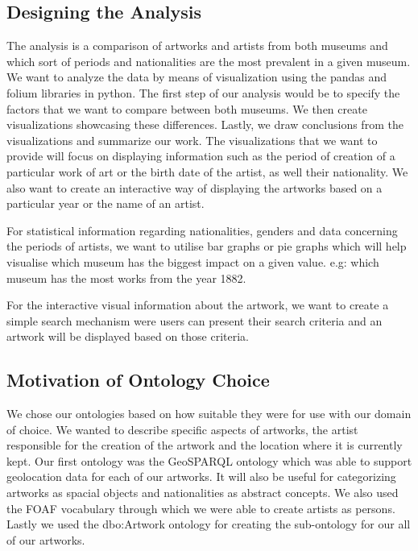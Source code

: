 \documentclass{article}
\begin{document}
\subsection{Designing the Analysis}

The analysis is a comparison of artworks and artists from both museums and which sort of periods and nationalities are the most prevalent in a given museum. We want to analyze the data by means of visualization using the pandas and folium libraries in python.  The first step of our analysis would be to specify the factors that we want to compare between both museums. We then create visualizations showcasing these differences. Lastly, we draw conclusions from the visualizations and summarize our work. The visualizations that we want to provide will focus on displaying information such as the period of creation of a particular work of art or the birth date of the artist, as well their nationality. We also want to create an interactive way of displaying the artworks based on a particular year or the name of an artist.

For statistical information regarding nationalities, genders and data concerning the periods of artists, we want to utilise bar graphs or pie graphs which will help visualise which museum has the biggest impact on a given value. e.g: which museum has the most works from the year 1882.

For the interactive visual information about the artwork, we want to create a simple search mechanism were users can present their search criteria and an artwork will be displayed based on those criteria.

\subsection{Motivation of Ontology Choice}


We chose our ontologies based on how suitable they were for use with our domain of choice. We wanted to describe specific aspects of artworks, the artist responsible for the creation of the artwork and the location where it is currently kept. Our first ontology was the GeoSPARQL ontology\cite{GeoSparql} which was able to support geolocation data for each of our artworks. It will also be useful for categorizing artworks as spacial objects and nationalities as abstract concepts. We also used the FOAF\cite{Foaf} vocabulary through which we were able to create artists as persons. Lastly we used the dbo:Artwork ontology\cite{Artwork} for creating the sub-ontology for our all of our artworks.
\end{document}
